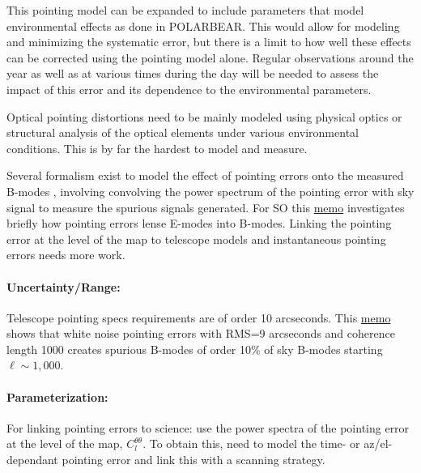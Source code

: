 This pointing model can be expanded to include parameters that model environmental effects as done in POLARBEAR. This would allow for modeling and minimizing the systematic error, but there is a limit to how well these effects can be corrected using the pointing model alone. Regular observations around the year as well as at various times during the day will be needed to assess the impact of this error and its dependence to the environmental parameters.

Optical pointing distortions need to be mainly modeled using physical optics or structural analysis of the optical elements under various environmental conditions. This is by far the hardest to model and measure.

Several formalism exist to model the effect of pointing errors onto the measured B-modes \cite{hu03, Shimon_2008}, involving convolving the power spectrum of the pointing error with sky signal to measure the spurious signals generated. For SO this \href{http://simonsobservatory.wdfiles.com/local--files/calandsys-telecon/eb_leakage_from_pointing_error.pdf?ukey=61f26ef33e8439a4e7096ab52c54c523066a4e35}{memo} investigates briefly how pointing errors lense E-modes into B-modes. Linking the pointing error at the level of the map to telescope models and instantaneous pointing errors needs more work.

\paragraph{Uncertainty/Range:}
Telescope pointing specs requirements are of order 10 arcseconds.
This \href{http://simonsobservatory.wdfiles.com/local--files/calandsys-telecon/eb_leakage_from_pointing_error.pdf?ukey=61f26ef33e8439a4e7096ab52c54c523066a4e35}{memo} shows that white noise pointing errors with RMS=9 arcseconds and coherence length 1000 creates spurious B-modes of order 10\% of sky B-modes starting $\ell \sim 1,000$.

\paragraph{Parameterization:}
For linking pointing errors to science: use the power spectra of the pointing error at the level of the map, $C_l^{\theta \theta}$.
To obtain this, need to model the time- or az/el-dependant pointing error and link this with a scanning strategy.
